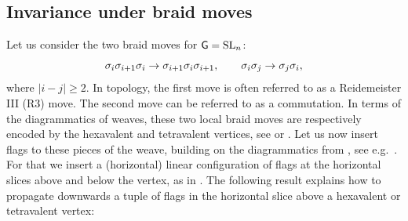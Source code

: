 \subsection{Invariance under braid moves}\label{ssec:braid_varieties_invariance} Let us consider the two braid moves for $\mathsf{G}=\operatorname{SL}_n$:
$$\sigma_i\sigma_{i+1}\sigma_i\to\sigma_{i+1}\sigma_i\sigma_{i+1},\qquad \sigma_i\sigma_j\to\sigma_j\sigma_i,$$
where $|i-j|\geq2$. In topology, the first move is often referred to as a Reidemeister III (R3) move. The second move can be referred to as a commutation. In terms of the diagrammatics of weaves, these two local braid moves are respectively encoded by the hexavalent and tetravalent vertices, see  or . Let us now insert flags to these pieces of the weave, building on the diagrammatics from , see e.g.~. For that we insert a (horizontal) linear configuration of flags at the horizontal slices above and below the vertex, as in . The following result explains how to propagate downwards a tuple of flags in the horizontal slice above a hexavalent or tetravalent vertex:

